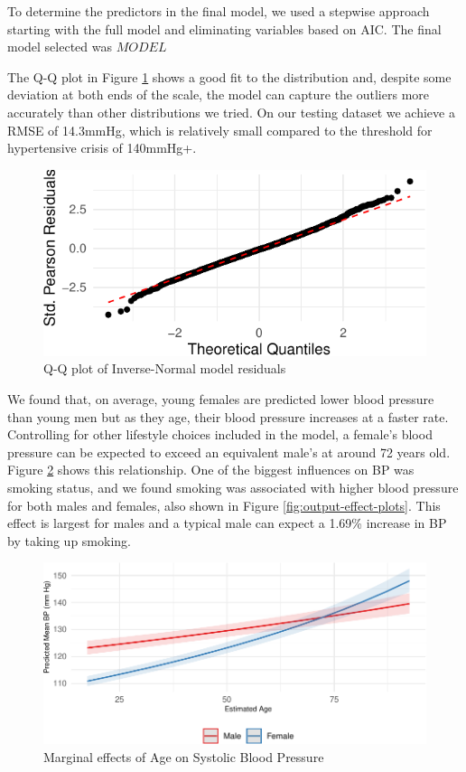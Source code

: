 \documentclass[
  11pt,
  twocolumn]{article}
\begin{document}
To determine the predictors in the final model, we used a stepwise
approach starting with the full model and eliminating variables based on
AIC. The final model selected was \(MODEL\)

The Q-Q plot in Figure \ref{fig:output-qq-plot} shows a good fit to the
distribution and, despite some deviation at both ends of the scale, the
model can capture the outliers more accurately than other distributions
we tried. On our testing dataset we achieve a RMSE of 14.3mmHg, which is
relatively small compared to the threshold for hypertensive crisis of
140mmHg+.

\begin{figure}[H]

{\centering \includegraphics{Coursework_files/figure-latex/output-qq-plot-1} 

}

\caption{Q-Q plot of Inverse-Normal model residuals}\label{fig:output-qq-plot}
\end{figure}

We found that, on average, young females are predicted lower blood
pressure than young men but as they age, their blood pressure increases
at a faster rate. Controlling for other lifestyle choices included in
the model, a female's blood pressure can be expected to exceed an
equivalent male's at around 72 years old. Figure
\ref{fig:output-effect-plots-age} shows this relationship. One of the
biggest influences on BP was smoking status, and we found smoking was
associated with higher blood pressure for both males and females, also
shown in Figure \ref{fig:output-effect-plots}. This effect is largest
for males and a typical male can expect a 1.69\% increase in BP by
taking up smoking.

\begin{figure}[H]
\includegraphics{Coursework_files/figure-latex/output-effect-plots-age-1} \caption{Marginal effects of Age on Systolic Blood Pressure}\label{fig:output-effect-plots-age}
\end{figure}
\end{document}

